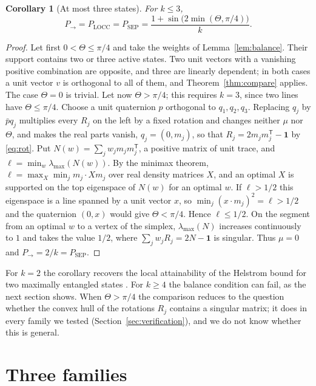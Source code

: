 \documentclass[11pt,a4paper]{article}
\newtheorem{corollary}[theorem]{Corollary}
\theoremstyle{definition}
\theoremstyle{plain}
\newcommand{\one}{\mathbf{1}}
\newcommand{\T}{\mathsf{T}}
\newcommand{\Pow}{P_{\to}}
\newcommand{\Psep}{P_{\mathrm{SEP}}}
\newcommand{\Plocc}{P_{\mathrm{LOCC}}}
\begin{document}
\begin{corollary}[At most three states]\label{cor:three}
For $k\le3$,
\[
\Pow=\Plocc=\Psep=\frac{1+\sin\bigl(2\min(\Theta,\pi/4)\bigr)}{k}.
\]
\end{corollary}
\begin{proof}
Let first $0<\Theta\le\pi/4$ and take the weights of
Lemma~\ref{lem:balance}. Their support contains two or three active states.
Two unit vectors with a vanishing positive combination are opposite, and
three are linearly dependent; in both cases a unit vector $v$ is orthogonal to
all of them, and Theorem~\ref{thm:compare} applies. The case $\Theta=0$ is
trivial. Let now $\Theta>\pi/4$; this requires $k=3$, since two lines have
$\Theta\le\pi/4$. Choose a unit quaternion $p$ orthogonal to
$q_1,q_2,q_3$. Replacing $q_j$ by $\bar pq_j$ multiplies every $R_j$ on the
left by a fixed rotation and changes neither $\mu$ nor $\Theta$, and makes the
real parts vanish, $q_j=(0,m_j)$, so that $R_j=2m_jm_j^\T-\one$ by
\eqref{eq:rot}. Put $N(w)=\sum_jw_jm_jm_j^\T$, a positive matrix of unit
trace, and $\ell=\min_w\lambda_{\max}(N(w))$. By the minimax theorem,
$\ell=\max_X\min_jm_j\cdot Xm_j$ over real density matrices $X$, and an
optimal $X$ is supported on the top eigenspace of $N(w)$ for an optimal $w$.
If $\ell>1/2$ this eigenspace is a line spanned by a unit vector $x$, so
$\min_j(x\cdot m_j)^2=\ell>1/2$ and the quaternion $(0,x)$ would give
$\Theta<\pi/4$. Hence $\ell\le1/2$. On the segment from an optimal $w$ to a
vertex of the simplex, $\lambda_{\max}(N)$ increases continuously to $1$ and
takes the value $1/2$, where $\sum_jw_jR_j=2N-\one$ is singular. Thus
$\mu=0$ and $\Pow=2/k=\Psep$.
\end{proof}

For $k=2$ the corollary recovers the local attainability of the Helstrom
bound for two maximally entangled states \cite{Virmani2001}. For $k\ge4$ the
balance condition can fail, as the next section shows. When
$\Theta>\pi/4$ the comparison reduces to the question whether the convex
hull of the rotations $R_j$ contains a singular matrix; it does in every
family we tested (Section~\ref{sec:verification}), and we do not know whether
this is general.

\section{Three families}\label{sec:examples}
\end{document}
